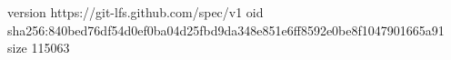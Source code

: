 version https://git-lfs.github.com/spec/v1
oid sha256:840bed76df54d0ef0ba04d25fbd9da348e851e6ff8592e0be8f1047901665a91
size 115063

